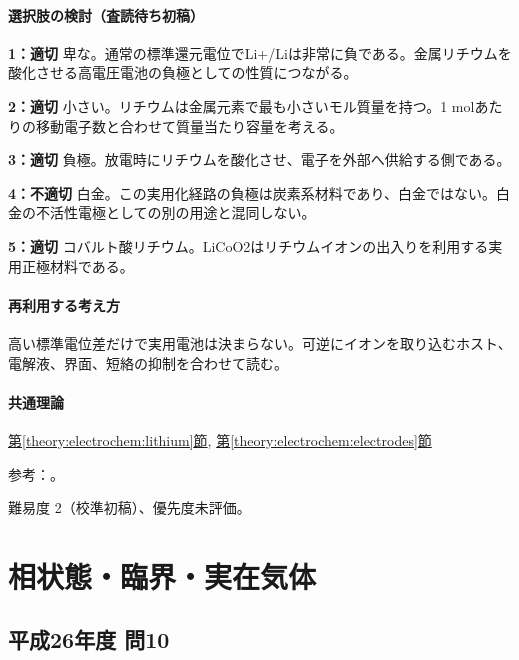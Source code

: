 \paragraph{選択肢の検討（査読待ち初稿）}\mbox{}\par

\noindent\textbf{1：適切} 卑な。通常の標準還元電位でLi+/Liは非常に負である。金属リチウムを酸化させる高電圧電池の負極としての性質につながる。\par

\noindent\textbf{2：適切} 小さい。リチウムは金属元素で最も小さいモル質量を持つ。1 molあたりの移動電子数と合わせて質量当たり容量を考える。\par

\noindent\textbf{3：適切} 負極。放電時にリチウムを酸化させ、電子を外部へ供給する側である。\par

\noindent\textbf{4：不適切} 白金。この実用化経路の負極は炭素系材料であり、白金ではない。白金の不活性電極としての別の用途と混同しない。\par

\noindent\textbf{5：適切} コバルト酸リチウム。LiCoO2はリチウムイオンの出入りを利用する実用正極材料である。\par

\paragraph{再利用する考え方} 高い標準電位差だけで実用電池は決まらない。可逆にイオンを取り込むホスト、電解液、界面、短絡の抑制を合わせて読む。

\paragraph{共通理論} \hyperref[theory:electrochem:lithium]{第\ref*{theory:electrochem:lithium}節}, \hyperref[theory:electrochem:electrodes]{第\ref*{theory:electrochem:electrodes}節}

\par 参考：\cite{nobel_lithium2019,openstax_batteries}。

\par 難易度 2（校準初稿）、優先度未評価。

\section{相状態・臨界・実在気体}

\subsection{平成26年度 問10}
\label{q:h26-reg-applied-10}

